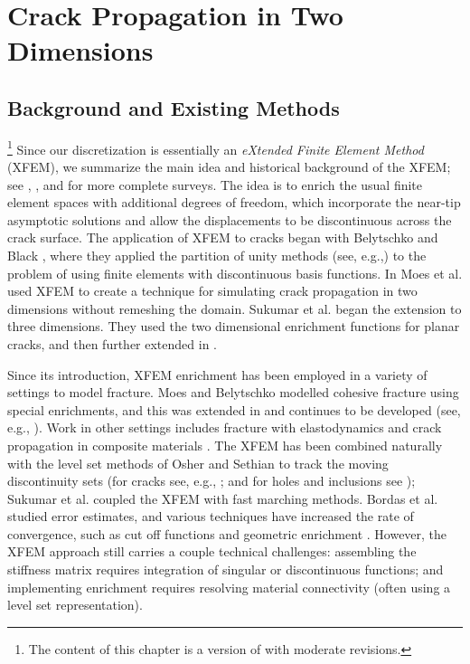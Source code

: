 %

\chapter{Crack Propagation in Two Dimensions} \label{chap:partI.crackpropagation}

\section{Background and Existing Methods}

\footnote{The content of this chapter is a version of \cite{Richardson11} with moderate revisions.}
Since our discretization is essentially an \emph{eXtended Finite Element Method} (XFEM), we summarize the main idea and historical background of the XFEM; see \cite{Belytschko09}, \cite{Karihaloo03}, and \cite{Abdelaziz08} for more complete surveys. The idea is to enrich the usual finite element spaces with additional degrees of freedom, which incorporate the near-tip asymptotic solutions and allow the displacements to be discontinuous across the crack surface. The application of XFEM to cracks began with Belytschko and Black \cite{Belytschko99}, where they applied the partition of unity methods (see, e.g.,\cite{Melenk96}) to the problem of using finite elements with discontinuous basis functions. In \cite{Moes99} Moes et al. used XFEM to create a technique for simulating crack propagation in two dimensions without remeshing the domain. Sukumar et al. \cite{Sukumar00} began the extension to three dimensions. They used the two dimensional enrichment functions for planar cracks, and then further extended in \cite{Areias05}.

Since its introduction, XFEM enrichment has been employed in a variety of settings to model fracture. Moes and Belytschko \cite{Moes02b} modelled cohesive fracture using special enrichments, and this was extended in \cite{Zi.Goangseup03} and continues to be developed (see, e.g., \cite{Mariani03, Borst04, Asferg07}). Work in other settings includes fracture with elastodynamics \cite{Belytschko04} and crack propagation in composite materials \cite{Huynh09}. The XFEM has been combined naturally with the level set methods of Osher and Sethian \cite{Osher88, Osher04} to track the moving discontinuity sets (for cracks see, e.g., \cite{Belytschko01, Moes02a, Gravouil02, Duflot07, Prabel07}; and for holes and inclusions see \cite{Sukumar01}); Sukumar et al. \cite{Sukumar08} coupled the XFEM with fast marching methods. Bordas et al. \cite{Bordas07} studied error estimates, and various techniques have increased the rate of convergence, such as cut off functions and geometric enrichment \cite{Chahine06, Chahine08, Shen09}. However, the XFEM approach still carries a couple technical challenges: assembling the stiffness matrix requires integration of singular or discontinuous functions; and implementing enrichment requires resolving material connectivity (often using a level set representation).

